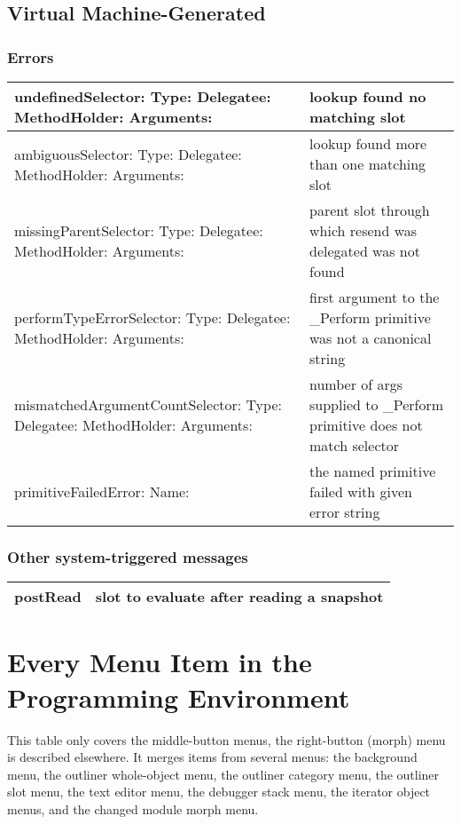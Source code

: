 \documentclass[letterpaper,10pt,english]{sphinxmanual}
\begin{document}
\subsection{Virtual Machine-Generated}
\label{\detokenize{usefulselectors:virtual-machine-generated}}

\subsubsection{Errors}
\label{\detokenize{usefulselectors:errors}}
\noindent\begin{tabulary}{\linewidth}{p{5cm} p{10cm}}
\hline

undefinedSelector: Type: Delegatee: MethodHolder: Arguments:
&
lookup found no matching slot
\\
\hline
ambiguousSelector: Type: Delegatee: MethodHolder: Arguments:
&
lookup found more than one matching slot
\\
\hline
missingParentSelector: Type: Delegatee: MethodHolder: Arguments:
&
parent slot through which resend was delegated was not found
\\
\hline
performTypeErrorSelector: Type: Delegatee: MethodHolder: Arguments:
&
first argument to the \_Perform primitive was not a canonical string
\\
\hline
mismatchedArgumentCountSelector: Type: Delegatee: MethodHolder: Arguments:
&
number of args supplied to \_Perform primitive does not match selector
\\
\hline
primitiveFailedError: Name:
&
the named primitive failed with given error string
\\
\hline\end{tabulary}



\subsubsection{Other system-triggered messages}
\label{\detokenize{usefulselectors:other-system-triggered-messages}}
\noindent\begin{tabulary}{\linewidth}{p{5cm} p{10cm}}
\hline

postRead
&
slot to evaluate after reading a snapshot
\\
\hline\end{tabulary}



\section{Every Menu Item in the Programming Environment}
\label{\detokenize{menus::doc}}\label{\detokenize{menus:every-menu-item-in-the-programming-environment}}
This table only covers the middle-button menus, the right-button (morph) menu is described elsewhere.
It merges items from several menus: the background menu, the outliner whole-object
menu, the outliner category menu, the outliner slot menu, the text editor menu, the debugger stack
menu, the iterator object menus, and the changed module morph menu.
\end{document}
